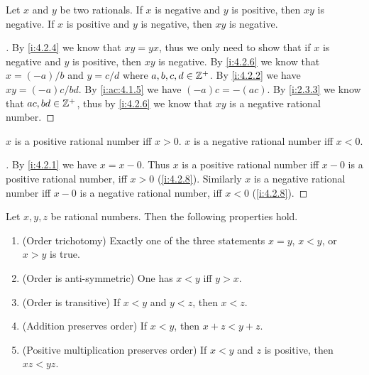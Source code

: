 \begin{ac}\label{i:ac:4.2.8}
  Let \(x\) and \(y\) be two rationals.
  If \(x\) is negative and \(y\) is positive, then \(xy\) is negative.
  If \(x\) is positive and \(y\) is negative, then \(xy\) is negative.
\end{ac}

\begin{proof}[]
  By \cref{i:4.2.4} we know that \(xy = yx\), thus we only need to show that if \(x\) is negative and \(y\) is positive, then \(xy\) is negative.
  By \cref{i:4.2.6} we know that \(x = (-a) / b\) and \(y = c / d\) where \(a, b, c, d \in \mathbb{Z}^+\).
  By \cref{i:4.2.2} we have \(xy = (-a)c / bd\).
  By \cref{i:ac:4.1.5} we have \((-a)c = -(ac)\).
  By \cref{i:2.3.3} we know that \(ac, bd \in \mathbb{Z}^+\), thus by \cref{i:4.2.6} we know that \(xy\) is a negative rational number.
\end{proof}

\begin{ac}\label{i:ac:4.2.9}
  \(x\) is a positive rational number iff \(x > 0\).
  \(x\) is a negative rational number iff \(x < 0\).
\end{ac}

\begin{proof}[]
  By \cref{i:4.2.1} we have \(x = x - 0\).
  Thus \(x\) is a positive rational number iff \(x - 0\) is a positive rational number, iff \(x > 0\) (\cref{i:4.2.8}).
  Similarly \(x\) is a negative rational number iff \(x - 0\) is a negative rational number, iff \(x < 0\) (\cref{i:4.2.8}).
\end{proof}

\begin{prop}\label{i:4.2.9}
  Let \(x, y, z\) be rational numbers.
  Then the following properties hold.
  \begin{enumerate}
    \item (Order trichotomy)
          Exactly one of the three statements \(x = y\), \(x < y\), or \(x > y\) is true.
    \item (Order is anti-symmetric)
          One has \(x < y\) iff \(y > x\).
    \item (Order is transitive)
          If \(x < y\) and \(y < z\), then \(x < z\).
    \item (Addition preserves order)
          If \(x < y\), then \(x + z < y + z\).
    \item (Positive multiplication preserves order)
          If \(x < y\) and \(z\) is positive, then \(xz < yz\).
  \end{enumerate}
\end{prop}

